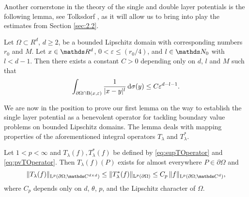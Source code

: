 Another cornerstone in the theory of the single and double layer potentials is the following lemma, see Tolksdorf \cite[Lem. 4.3.2]{tolksdorf}, as it will allow us to bring into play the estimates from Section \ref{sec:2.2}.

\begin{lem}
  \label{lem:central}
  Let $\Omega \subset R^d$, $d \geq 2$, be a bounded Lipschitz domain with corresponding numbers $r_0$ and $M$.
  Let $x \in \R^d$, $0 < \varepsilon \leq (r_0/4)$, and $l \in \N_0$ with $l < d - 1$.
  Then there exists a constant $C > 0$ depending only on $d$, $l$ and $M$ such that
  \begin{align*}
    \int_{\partial\Omega \cap \mathrm{B}(x, \varepsilon)} \frac{1}{|x - y|^l} \, {\operatorname{d}\!{\sigma}}(y) \leq C \varepsilon^{d - l - 1}.
  \end{align*}
\end{lem}

We are now in the position to prove our first lemma on the way to establish the single layer potential as a benevolent operator for tackling boundary value problems on bounded Lipschitz domains. The lemma deals with mapping properties of the aforementioned integral operators $T_\lambda$ and $T_\lambda^*$.

\begin{lem}
  \label{lem:lpBoundednessT}
  Let $1 < p < \infty$ and $T_\lambda(f), T_\lambda^*(f)$ be defined by \eqref{eq:supTOperator} and \eqref{eq:pvTOperator}.
  Then $T_\lambda(f)(P)$ exists for almost everywhere $P \in \partial\Omega$ and
  \begin{align}
    \label{eq:lpBoundednessT}
    \|T_\lambda(f) \|_{\Ell^p(\partial\Omega; \C^{d \times d})}
    \leq \|T_\lambda^*(f) \|_{\Ell^p(\partial\Omega)}
    \leq C_p \, \|f\|_{\Ell^p(\partial\Omega; \C^d)},
  \end{align}
  where $C_p$ depends only on $d$, $\theta$, $p$, and the Lipschitz character of $\Omega$.
\end{lem}

